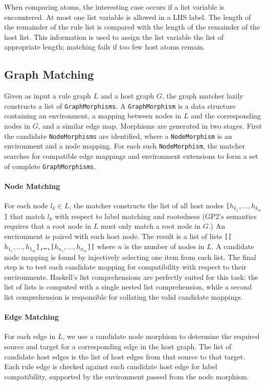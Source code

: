 When comparing atoms, the interesting case occurs if a list variable is encountered. At most one list variable is allowed in a LHS label. The length of the remainder of the rule list is compared with the length of the remainder of the host list. This information is used to assign the list variable the list of appropriate length; matching fails if too few host atoms remain.

\subsection{Graph Matching}\label{sec:graph-match}

Given as input a rule graph $L$ and a host graph $G$, the graph matcher lazily constructs a list of \texttt{GraphMorphisms}. A \texttt{GraphMorphism} is a data structure containing an environment, a mapping between nodes in $L$ and the corresponding nodes in $G$, and a similar edge map. Morphisms are generated in two stages. First the candidate \texttt{NodeMorphisms} are identified, where a \texttt{NodeMorphism} is an environment and a node mapping. For each such \texttt{NodeMorphism}, the matcher searches for compatible edge mappings and environment extensions to form a set of complete \texttt{GraphMorphisms}.

\paragraph{Node Matching}
For each node $l_k \in L$, the matcher constructs the list of all host nodes \texttt{[$h_{k_1}, \ldots, h_{k_m}$]} that match $l_k$ with respect to label matching and rootedness (GP2's semantics requires that a root node in $L$ must only match a root node in $G$.) An environment is paired with each host node. The result is a list of lists \texttt{[[$h_{1_1}, \ldots, h_{1_m}$],\ldots,[$h_{n_1}, \ldots, h_{n_m}$]]} where $n$ is the number of nodes in $L$. A candidate node mapping is found by injectively selecting one item from each list. The final step is to test each candidate mapping for compatibility with respect to their environments. Haskell's list comprehensions are perfectly suited for this task: the list of lists is computed with a single nested list comprehension, while a second list comprehension is responsible for collating the valid candidate mappings. 

\paragraph{Edge Matching} 
For each edge in $L$, we use a candidate node morphism to determine the required source and target for a corresponding edge in the host graph. The list of candidate host edges is the list of host edges from that source to that target. Each rule edge is checked against each candidate host edge for label compatibility, supported by the environment passed from the node morphism.

